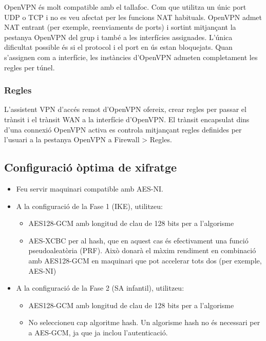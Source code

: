 \documentclass[
  10pt,
]{krantz}
\providecommand{\tightlist}{%
  \setlength{\itemsep}{0pt}\setlength{\parskip}{0pt}}
\begin{document}
OpenVPN és molt compatible amb el tallafoc. Com que utilitza un únic port UDP o TCP i no es veu afectat per les funcions NAT habituals. OpenVPN admet NAT entrant (per exemple, reenviaments de ports) i sortint mitjançant la pestanya OpenVPN del grup i també a les interfícies assignades. L'única dificultat possible és si el protocol i el port en ús estan bloquejats. Quan s'assignen com a interfície, les instàncies d'OpenVPN admeten completament les regles per túnel.

\hypertarget{regles}{%
\subsubsection{Regles}\label{regles}}

L'assistent VPN d'accés remot d'OpenVPN ofereix, crear regles per passar el trànsit i el trànsit WAN a la interfície d'OpenVPN. El trànsit encapsulat dins d'una connexió OpenVPN activa es controla mitjançant regles definides per l'usuari a la pestanya OpenVPN a Firewall \textgreater{} Regles.

\hypertarget{configuraciuxf3-uxf2ptima-de-xifratge}{%
\subsection{Configuració òptima de xifratge}\label{configuraciuxf3-uxf2ptima-de-xifratge}}

\begin{itemize}
\tightlist
\item
  Feu servir maquinari compatible amb AES-NI.
\item
  A la configuració de la Fase 1 (IKE), utilitzeu:

  \begin{itemize}
  \tightlist
  \item
    AES128-GCM amb longitud de clau de 128 bits per a l'algorisme
  \item
    AES-XCBC per al hash, que en aquest cas és efectivament una funció pseudoaleatòria (PRF). Això donarà el màxim rendiment en combinació amb AES128-GCM en maquinari que pot accelerar tots dos (per exemple, AES-NI)
  \end{itemize}
\item
  A la configuració de la Fase 2 (SA infantil), utilitzeu:

  \begin{itemize}
  \tightlist
  \item
    AES128-GCM amb longitud de clau de 128 bits per a l'algorisme
  \item
    No seleccioneu cap algoritme hash. Un algorisme hash no és necessari per a AES-GCM, ja que ja inclou l'autenticació.
  \end{itemize}
\end{itemize}
\end{document}

